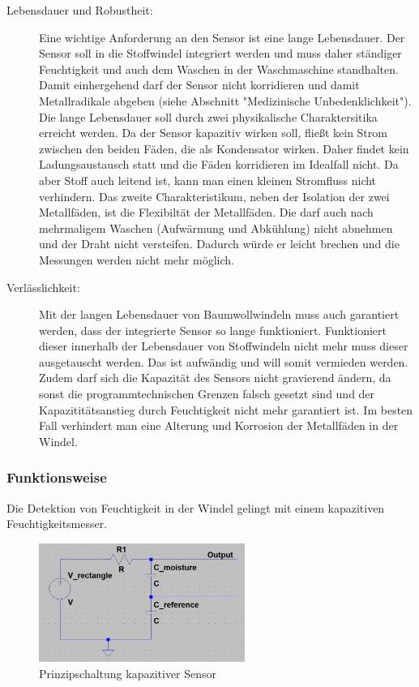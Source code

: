 \begin{description}
 \item[Lebensdauer und Robustheit:]
Eine wichtige Anforderung an den Sensor ist eine lange Lebensdauer. Der Sensor soll in die Stoffwindel integriert werden und muss daher ständiger Feuchtigkeit und auch dem Waschen in der Waschmaschine standhalten. Damit einhergehend darf der Sensor nicht korridieren und damit Metallradikale abgeben (siehe Abschnitt "Medizinische Unbedenklichkeit"). Die lange Lebensdauer soll durch zwei physikalische Charaktersitika erreicht werden. Da der Sensor kapazitiv wirken soll, fließt kein Strom zwischen den beiden Fäden, die als Kondensator wirken. Daher findet kein Ladungsaustausch statt und die Fäden korridieren im Idealfall nicht. Da aber Stoff auch leitend ist, kann man einen kleinen Stromfluss nicht verhindern. Das zweite Charakteristikum, neben der Isolation der zwei Metallfäden, ist die Flexibiltät der Metallfäden. Die darf auch nach mehrmaligem Waschen (Aufwärmung und Abkühlung) nicht abnehmen und der Draht nicht versteifen. Dadurch würde er leicht brechen und die Messungen werden nicht mehr möglich. 

 \item[Verlässlichkeit:]
Mit der langen Lebensdauer von Baumwollwindeln muss auch garantiert werden, dass der integrierte Sensor so lange funktioniert. Funktioniert dieser innerhalb der Lebensdauer von Stoffwindeln nicht mehr muss dieser ausgetauscht werden. Das ist aufwändig und will somit vermieden werden. Zudem darf sich die Kapazität des Sensors nicht gravierend ändern, da sonst die programmtechnischen Grenzen falsch gesetzt sind und der Kapazititätsanstieg durch Feuchtigkeit nicht mehr garantiert ist. Im besten Fall verhindert man eine Alterung und Korrosion der Metallfäden in der Windel.  
\end{description}

\subsubsection{Funktionsweise}
Die Detektion von Feuchtigkeit in der Windel gelingt mit einem kapazitiven Feuchtigkeitsmesser.

\begin{figure}[ht]
	\centering
		\includegraphics[width=0.6\textwidth]{includes/kom/graphics/cap_sensor_circuit}
	\caption{Prinzipschaltung kapazitiver Sensor}
	\label{fig:cap_sensor}
\end{figure}

